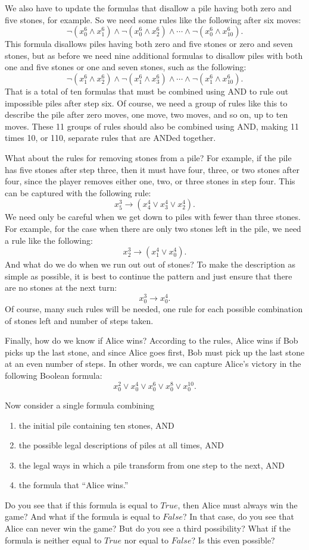We also have to update the formulas that disallow a pile having both zero and five stones, for example. So we
need some rules like the following after six moves:
$$\neg(x_{0}^{6} \wedge x_{1}^{6}) \wedge \neg(x_{0}^{6} \wedge x_{2}^{6}) \wedge \cdots \wedge \neg(x_{0}^{6} \wedge x_{10}^{6}).$$
This formula disallows piles having both zero and five stones or zero and seven stones, but as before we need nine additional
formulas to disallow piles with both one and five stones or one and seven stones, such as the following:
$$\neg(x_{1}^{6} \wedge x_{2}^{6}) \wedge \neg(x_{1}^{6} \wedge x_{3}^{6}) \wedge \cdots \wedge \neg(x_{1}^{6} \wedge x_{10}^{6}).$$
That is a total of ten formulas that must be combined using AND to rule out impossible piles after step six. Of course,
we need a group of rules like this to describe the pile after zero moves, one move, two moves, and so on, up to ten moves. These
11 groups of rules should also be combined using AND, making 11 times 10, or 110, separate rules that are ANDed together.

What about the rules for removing stones from a pile? For example, if the pile has five stones after step three, then it must
have four, three, or two stones after four, since the player removes either one, two, or three stones in step four. This can
be captured with the following rule:
$$x_{5}^{3} \rightarrow (x_{4}^{4} \vee x_{3}^{4} \vee x_{2}^{4}).$$
We need only be careful when we get down to piles with fewer than three stones. For example, for the case when there are only 
two stones left in the pile, we need a rule like the following:
$$x_{2}^{3} \rightarrow (x_{1}^{4} \vee x_{0}^{4}).$$
And what do we do when we run out out of stones? To make the description as simple as possible, it is best to continue the pattern
and just ensure that there are no stones at the next turn:
$$x_{0}^{3} \rightarrow x_{0}^{4}.$$
Of course, many such rules will be needed, one rule for each possible combination of stones left and number of steps taken.

Finally, how do we know if Alice wins? According to the rules, Alice wins if Bob picks up the last stone, and since Alice
goes first, Bob must pick up the last stone at an even number of steps. In other words, we can capture Alice's victory
in the following Boolean formula:
$$x_{0}^{2} \vee x_{0}^{4} \vee x_{0}^{6} \vee x_{0}^{8} \vee x_{0}^{10}.$$

Now consider a single formula combining
\begin{enumerate}
\item the initial pile containing ten stones, AND
\item the possible legal descriptions of piles at all times, AND
\item the legal ways in which a pile transform from one step to the next, AND
\item the formula that ``Alice wins.''
\end{enumerate}
Do you see that if this formula is equal to $True$, then Alice must always win the game? And what if the formula is 
equal to $False$? In that case, do you see that Alice can never win the game? But do you see a third possibility? 
What if the formula is neither equal to $True$ nor equal to $False$? Is this even possible?

